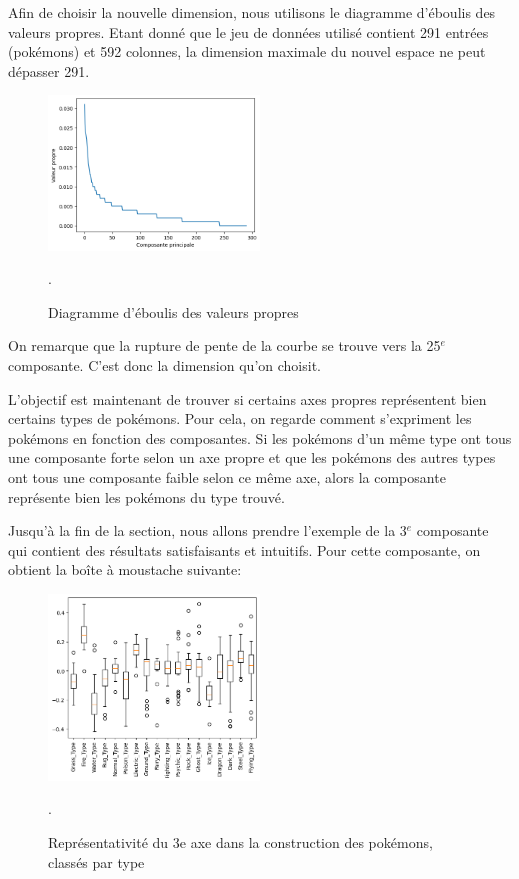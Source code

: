 \documentclass[a4paper,12pt]{article}
\begin{document}
Afin de choisir la nouvelle dimension, nous utilisons le diagramme d'éboulis des
valeurs propres. Etant donné que le jeu de données utilisé contient 291 entrées
(pokémons) et 592 colonnes, la dimension maximale du nouvel espace ne peut
dépasser 291. 
\newpage
\begin{figure}[!h]
    \centering
    \includegraphics[width=0.5\textwidth]{eboulis_MCA.png}
    \caption{Diagramme d'éboulis des valeurs propres}.
\end{figure}

On remarque que la rupture de pente de la courbe se trouve vers la 25$^{e}$
composante. C'est donc la dimension qu'on choisit.

L'objectif est maintenant de trouver si certains axes propres représentent bien
certains types de pokémons. Pour cela, on regarde comment s'expriment les
pokémons en fonction des composantes. Si les pokémons d'un même type ont tous
une composante forte selon un axe propre et que les pokémons des autres types
ont tous une composante faible selon ce même axe, alors la composante représente
bien les pokémons du type trouvé. 

Jusqu'à la fin de la section, nous allons prendre l'exemple de la 3$^{e}$
composante qui contient des résultats satisfaisants et intuitifs. Pour cette
composante, on obtient la boîte à moustache suivante: 
\begin{figure}[!h]
    \centering
    \includegraphics[width=0.5\textwidth]{moustache_MCA.png}
    \caption{Représentativité du 3e axe dans la construction des pokémons,
    classés par type}.
\end{figure}
\end{document}
